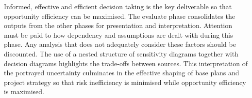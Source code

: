 Informed, effective and efficient decision taking is the key deliverable so that opportunity efficiency can be maximised.
The evaluate phase consolidates the outputs from the other phases for presentation and interpretation.
Attention must be paid to how dependency and assumptions are dealt with during this phase.
Any analysis that does not adequately consider these factors should be discounted.
The use of a nested structure of sensitivity diagrams together with decision diagrams \citep{chapman} highlights the trade-offs between sources.
This interpretation of the portrayed uncertainty culminates in the effective shaping of base plans and project strategy so that risk inefficiency is minimised while opportunity efficiency is maximised.




